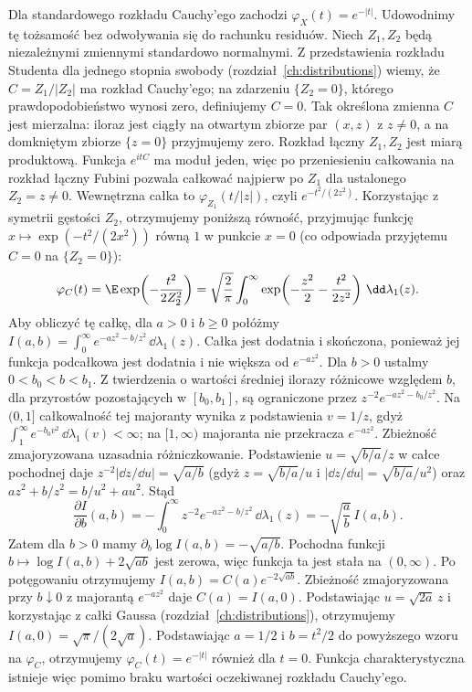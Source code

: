 \begin{przyklad}
Dla standardowego rozkładu Cauchy'ego zachodzi
$\varphi_X(t)=e^{-|t|}$. Udowodnimy tę tożsamość
bez odwoływania się do rachunku residuów.
Niech $Z_1,Z_2$ będą niezależnymi zmiennymi standardowo
normalnymi. Z przedstawienia rozkładu Studenta dla
jednego stopnia swobody (rozdział~\ref{ch:distributions})
wiemy, że $C=Z_1/|Z_2|$ ma rozkład Cauchy'ego;
na zdarzeniu $\{Z_2=0\}$, którego prawdopodobieństwo
wynosi zero, definiujemy $C=0$.
Tak określona zmienna $C$ jest mierzalna: iloraz jest
ciągły na otwartym zbiorze par $(x,z)$ z $z\ne0$,
a na domkniętym zbiorze $\{z=0\}$ przyjmujemy zero.
Rozkład łączny $Z_1,Z_2$ jest miarą produktową.
Funkcja $e^{itC}$ ma moduł jeden, więc po przeniesieniu
całkowania na rozkład łączny Fubini pozwala
całkować najpierw po $Z_1$ dla ustalonego $Z_2=z\ne0$.
Wewnętrzna całka to $\varphi_{Z_1}(t/|z|)$, czyli
$e^{-t^2/(2z^2)}$. Korzystając z symetrii gęstości $Z_2$,
otrzymujemy poniższą równość, przyjmując funkcję
$x\mapsto\exp(-t^2/(2x^2))$ równą $1$ w punkcie $x=0$
(co odpowiada przyjętemu $C=0$ na $\{Z_2=0\}$):
\[
\varphi_C(t)=\E\exp\!\left(-\frac{t^2}{2Z_2^2}\right)
=\sqrt{\frac2\pi}\int_0^\infty
\exp\!\left(-\frac{z^2}{2}-\frac{t^2}{2z^2}\right)
\,\dd\lambda_1(z).
\]
Aby obliczyć tę całkę, dla $a>0$ i $b\geq0$ połóżmy
$I(a,b)=\int_0^\infty e^{-az^2-b/z^2}\,\dd\lambda_1(z)$.
Całka jest dodatnia i skończona, ponieważ jej funkcja
podcałkowa jest dodatnia i nie większa od $e^{-az^2}$.
Dla $b>0$ ustalmy $0<b_0<b<b_1$. Z twierdzenia o wartości
średniej ilorazy różnicowe względem $b$, dla przyrostów
pozostających w $[b_0,b_1]$, są ograniczone przez
$z^{-2}e^{-az^2-b_0/z^2}$.
Na $(0,1]$ całkowalność tej majoranty wynika z podstawienia
$v=1/z$, gdyż $\int_1^\infty e^{-b_0v^2}\,\dd\lambda_1(v)<\infty$;
na $[1,\infty)$ majoranta nie przekracza $e^{-az^2}$.
Zbieżność zmajoryzowana uzasadnia różniczkowanie.
Podstawienie $u=\sqrt{b/a}/z$ w całce pochodnej daje
$z^{-2}|\dd z/\dd u|=\sqrt{a/b}$ (gdyż
$z=\sqrt{b/a}/u$ i $|\dd z/\dd u|=\sqrt{b/a}/u^2$) oraz
$az^2+b/z^2=b/u^2+au^2$. Stąd
\[
\frac{\partial I}{\partial b}(a,b)
=-\int_0^\infty z^{-2}e^{-az^2-b/z^2}\,\dd\lambda_1(z)
=-\sqrt{\frac ab}\,I(a,b).
\]
Zatem dla $b>0$ mamy $\partial_b\log I(a,b)=-\sqrt{a/b}$.
Pochodna funkcji $b\mapsto\log I(a,b)+2\sqrt{ab}$
jest zerowa, więc funkcja ta jest stała na $(0,\infty)$.
Po potęgowaniu otrzymujemy $I(a,b)=C(a)e^{-2\sqrt{ab}}$.
Zbieżność zmajoryzowana przy $b\downarrow0$ z majorantą
$e^{-az^2}$ daje $C(a)=I(a,0)$.
Podstawiając $u=\sqrt{2a}\,z$ i korzystając z całki Gaussa
(rozdział~\ref{ch:distributions}), otrzymujemy
$I(a,0)=\sqrt\pi/(2\sqrt a)$.
Podstawiając $a=1/2$ i $b=t^2/2$ do powyższego
wzoru na $\varphi_C$, otrzymujemy
$\varphi_C(t)=e^{-|t|}$ również dla $t=0$.
Funkcja charakterystyczna istnieje więc pomimo braku
wartości oczekiwanej rozkładu Cauchy'ego.
\end{przyklad}

